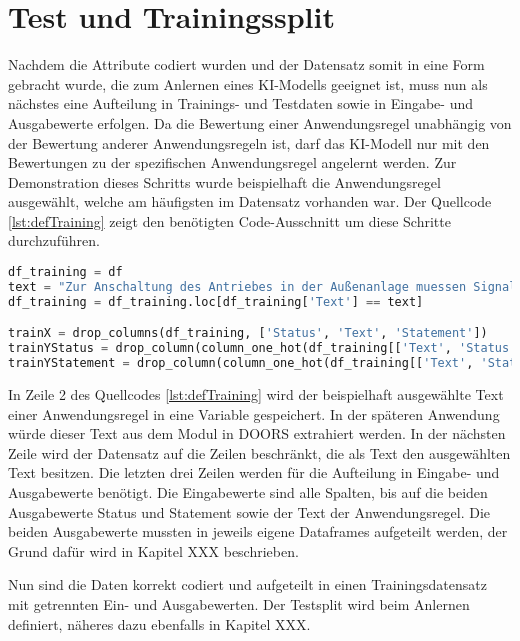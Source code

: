 \section{Test und Trainingssplit}
\label{chap:Trainingssplit}
Nachdem die Attribute codiert wurden und der Datensatz somit in eine Form gebracht wurde, die zum Anlernen eines \ac{KI}-Modells geeignet ist, 
muss nun als nächstes eine Aufteilung in Trainings- und Testdaten sowie in Eingabe- und Ausgabewerte erfolgen. Da die Bewertung einer Anwendungsregel
unabhängig von der Bewertung anderer Anwendungsregeln ist, darf das \ac{KI}-Modell nur mit den Bewertungen zu der spezifischen Anwendungsregel angelernt werden.
Zur Demonstration dieses Schritts wurde beispielhaft die Anwendungsregel ausgewählt, welche am häufigsten im Datensatz vorhanden war. 
Der Quellcode \ref*{lst:defTraining} zeigt den benötigten Code-Ausschnitt um diese Schritte durchzuführen.

\begin{lstlisting}[language = python, caption={Definieren des Trainingsdatensatzes},captionpos=b, label = lst:defTraining, floatplacement=H]
df_training = df
text = "Zur Anschaltung des Antriebes in der Außenanlage muessen Signalkabel nach VDE 0816/2 oder Kabel mit vergleichbaren Eigenschaften verwendet werden. Die Verlegevorschriften des Kabels sind einzuhalten."
df_training = df_training.loc[df_training['Text'] == text]

trainX = drop_columns(df_training, ['Status', 'Text', 'Statement'])
trainYStatus = drop_column(column_one_hot(df_training[['Text', 'Status']], ['Status']), "Text")
trainYStatement = drop_column(column_one_hot(df_training[['Text', 'Statement']], ['Statement']), "Text")
\end{lstlisting}

In Zeile 2 des Quellcodes \ref*{lst:defTraining} wird der beispielhaft ausgewählte Text einer Anwendungsregel in eine Variable gespeichert. In der späteren Anwendung würde dieser Text
aus dem Modul in \ac{DOORS} extrahiert werden. In der nächsten Zeile wird der Datensatz auf die Zeilen beschränkt, die als Text den ausgewählten Text besitzen.
Die letzten drei Zeilen werden für die Aufteilung in Eingabe- und Ausgabewerte benötigt. Die Eingabewerte sind alle Spalten, bis auf die beiden Ausgabewerte \glqq Status\grqq{} und 
\glqq Statement\grqq{} sowie der Text der Anwendungsregel. Die beiden Ausgabewerte mussten in jeweils eigene Dataframes aufgeteilt werden, der Grund dafür wird in Kapitel XXX beschrieben.

Nun sind die Daten korrekt codiert und aufgeteilt in einen Trainingsdatensatz mit getrennten Ein- und Ausgabewerten. Der Testsplit wird beim Anlernen definiert, näheres dazu ebenfalls in Kapitel XXX.